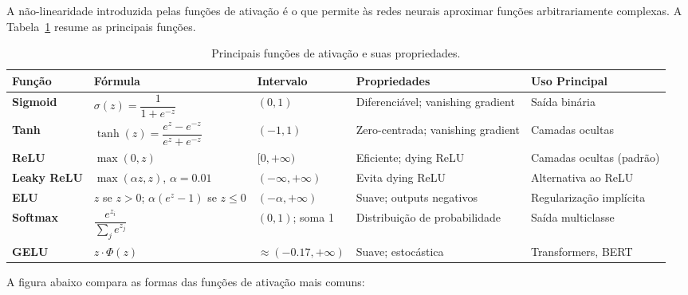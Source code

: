 \documentclass[12pt,a4paper]{article}
\begin{document}
A não-linearidade introduzida pelas funções de ativação é o que permite às redes neurais aproximar funções arbitrariamente complexas. A Tabela~\ref{tab:ativacoes} resume as principais funções.

\begin{table}[h!]
\centering
\caption{Principais funções de ativação e suas propriedades.}
\label{tab:ativacoes}
\renewcommand{\arraystretch}{1.6}
\begin{tabular}{>{\bfseries}p{2.2cm} p{4.5cm} p{1.6cm} p{2.5cm} p{3.4cm}}
\toprule
Função & Fórmula & Intervalo & Propriedades & Uso Principal \\
\midrule
Sigmoid & $\sigma(z) = \dfrac{1}{1+e^{-z}}$ & $(0, 1)$ & Diferenciável; vanishing gradient & Saída binária \\
Tanh & $\tanh(z) = \dfrac{e^z - e^{-z}}{e^z + e^{-z}}$ & $(-1, 1)$ & Zero-centrada; vanishing gradient & Camadas ocultas \\
ReLU & $\max(0, z)$ & $[0,+\infty)$ & Eficiente; dying ReLU & Camadas ocultas (padrão) \\
Leaky ReLU & $\max(\alpha z, z)$, $\alpha{=}0.01$ & $(-\infty,+\infty)$ & Evita dying ReLU & Alternativa ao ReLU \\
ELU & $z$ se $z>0$; $\alpha(e^z{-}1)$ se $z \leq 0$ & $(-\alpha,+\infty)$ & Suave; outputs negativos & Regularização implícita \\
Softmax & $\dfrac{e^{z_i}}{\sum_j e^{z_j}}$ & $(0,1)$; soma 1 & Distribuição de probabilidade & Saída multiclasse \\
GELU & $z \cdot \Phi(z)$ & $\approx(-0.17,+\infty)$ & Suave; estocástica & Transformers, BERT \\
\bottomrule
\end{tabular}
\end{table}

A figura abaixo compara as formas das funções de ativação mais comuns:

\begin{center}
\end{center}
\end{document}
